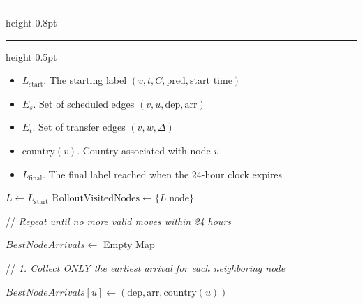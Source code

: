 \documentclass{article}
\newcommand{\CommentLine}[1]{
    \State // \textit{#1}
}
\begin{document}
\pagestyle{empty}
\allowdisplaybreaks[1] 
\setcounter{page}{1}


\setcounter{algorithm}{6}
\begin{center}
    \hrule height 0.8pt
    \vspace{0.3em}
    \label{alg:smart_greedy_rollout_probe}
    \vspace{0.2em}
    \hrule height 0.5pt
\end{center}

\begin{algorithmic}[1] %
    
    \Input
    \begin{itemize}
        \item $L_{\text{start}}$. The starting label $(v, t, C, \text{pred}, \text{start\_time})$
        \item $E_s$. Set of scheduled edges $(v, u, \text{dep}, \text{arr})$
        \item $E_t$. Set of transfer edges $(v, w, \Delta)$
        \item $\text{country}(v)$. Country associated with node $v$
    \end{itemize}

    \Output
    \begin{itemize}
        \item $L_{\text{final}}$. The final label reached when the 24-hour clock expires
    \end{itemize}
    \vspace{0.5em}

    \State $L \leftarrow L_{\text{start}}$
    \State $\text{RolloutVisitedNodes} \leftarrow \{L.\text{node}\}$ 

    \vspace{0.5em}
    \CommentLine{Repeat until no more valid moves within 24 hours}
    \Repeat
        \State $BestNodeArrivals \leftarrow$ Empty Map 

        \vspace{0.5em}
        \CommentLine{1. Collect ONLY the earliest arrival for each neighboring node}
                    \State $BestNodeArrivals[u] \leftarrow (\text{dep}, \text{arr}, \text{country}(u))$
                \EndIf
            \EndIf
        \EndFor


\end{algorithmic}
\end{document}

